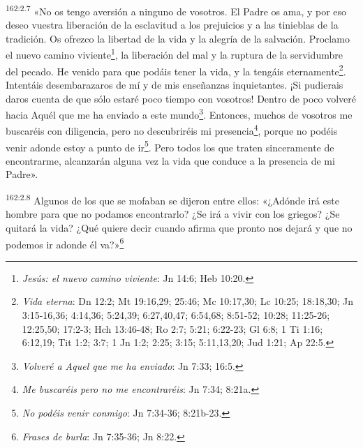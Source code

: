 \par
\textsuperscript{162:2.7} «No os tengo aversión a ninguno de vosotros. El Padre os ama, y por eso deseo vuestra liberación de la esclavitud a los prejuicios y a las tinieblas de la tradición. Os ofrezco la libertad de la vida y la alegría de la salvación. Proclamo el nuevo camino viviente\footnote{\textit{Jesús: el nuevo camino viviente}: Jn 14:6; Heb 10:20.}, la liberación del mal y la ruptura de la servidumbre del pecado. He venido para que podáis tener la vida, y la tengáis eternamente\footnote{\textit{Vida eterna}: Dn 12:2; Mt 19:16,29; 25:46; Mc 10:17,30; Lc 10:25; 18:18,30; Jn 3:15-16,36; 4:14,36; 5:24,39; 6:27,40,47; 6:54,68; 8:51-52; 10:28; 11:25-26; 12:25,50; 17:2-3; Hch 13:46-48; Ro 2:7; 5:21; 6:22-23; Gl 6:8; 1 Ti 1:16; 6:12,19; Tit 1:2; 3:7; 1 Jn 1:2; 2:25; 3:15; 5:11,13,20; Jud 1:21; Ap 22:5.}. Intentáis desembarazaros de mí y de mis enseñanzas inquietantes. ¡Si pudierais daros cuenta de que sólo estaré poco tiempo con vosotros! Dentro de poco volveré hacia Aquél que me ha enviado a este mundo\footnote{\textit{Volveré a Aquel que me ha enviado}: Jn 7:33; 16:5.}. Entonces, muchos de vosotros me buscaréis con diligencia, pero no descubriréis mi presencia\footnote{\textit{Me buscaréis pero no me encontraréis}: Jn 7:34; 8:21a.}, porque no podéis venir adonde estoy a punto de ir\footnote{\textit{No podéis venir conmigo}: Jn 7:34-36; 8:21b-23.}. Pero todos los que traten sinceramente de encontrarme, alcanzarán alguna vez la vida que conduce a la presencia de mi Padre».

\par
\textsuperscript{162:2.8} Algunos de los que se mofaban se dijeron entre ellos: «¿Adónde irá este hombre para que no podamos encontrarlo? ¿Se irá a vivir con los griegos? ¿Se quitará la vida? ¿Qué quiere decir cuando afirma que pronto nos dejará y que no podemos ir adonde él va?»\footnote{\textit{Frases de burla}: Jn 7:35-36; Jn 8:22.}

